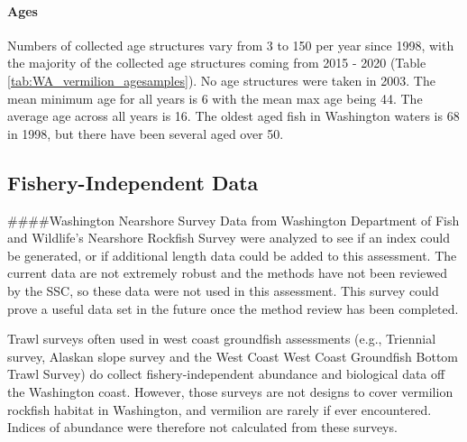 \documentclass[11pt,
  english,
  a4paper,
]{article}
\begin{document}
\leavevmode\tagmcend\tagstructend\par


\hypertarget{ages}{%
\paragraph{Ages}\label{ages}}

\leavevmode\tagmcend\tagstructend


Numbers of collected age structures vary from 3 to 150 per year since 1998, with the majority of the collected age structures coming from 2015 - 2020 (Table \ref{tab:WA_vermilion_agesamples}). No age structures were taken in 2003. The mean minimum age for all years is 6 with the mean max age being 44. The average age across all years is 16. The oldest aged fish in Washington waters is 68 in 1998, but there have been several aged over 50.

\leavevmode\tagmcend\tagstructend\par


\hypertarget{fishery-independent-data}{%
\subsection{Fishery-Independent Data}\label{fishery-independent-data}}

\leavevmode\tagmcend\tagstructend


\#\#\#\#Washington Nearshore Survey Data from Washington Department of Fish and Wildlife's Nearshore Rockfish Survey were analyzed to see if an index could be generated, or if additional length data could be added to this assessment. The current data are not extremely robust and the methods have not been reviewed by the SSC, so these data were not used in this assessment. This survey could prove a useful data set in the future once the method review has been completed.

\leavevmode\tagmcend\tagstructend\par


Trawl surveys often used in west coast groundfish assessments (e.g., Triennial survey, Alaskan slope survey and the West Coast West Coast Groundfish Bottom Trawl Survey) do collect fishery-independent abundance and biological data off the Washington coast. However, those surveys are not designs to cover vermilion rockfish habitat in Washington, and vermilion are rarely if ever encountered. Indices of abundance were therefore not calculated from these surveys.
\end{document}
